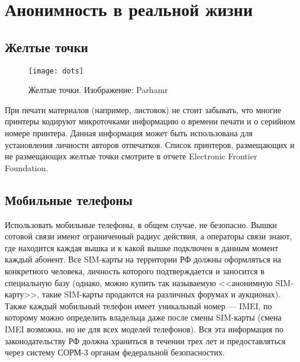 \chapter{Анонимность в реальной жизни}
\section{Желтые точки}
\begin{wrapfigure}[9]{r}{0.25\linewidth}
\texttt{[image: dots]}
\caption{Желтые точки. Изображение: Parhamr}
\end{wrapfigure}
При печати материалов (например, листовок) не стоит забывать, что многие принтеры  кодируют микроточками информацию о времени печати и о серийном номере принтера\cite{eff_dots}. Данная информация может быть использована для установления личности авторов отпечатков. Список принтеров, размещающих и не размещающих желтые точки смотрите в отчете Electronic Frontier Foundation\cite{eff_list}.
\section{Мобильные телефоны}
Использовать мобильные телефоны, в общем случае, не безопасно. Вышки сотовой связи имеют ограниченный радиус действия, а операторы связи знают, где находится каждая вышка и к какой вышке подключен в данным момент каждый абонент. Все SIM-карты на территории РФ должны оформляться на конкретного человека, личность которого подтверждается и заносится в специальную базу (однако, можно купить так называемую <<анонимную SIM-карту>>, такие SIM-карты продаются на различных форумах и аукционах). Также каждый мобильный телефон имеет уникальный номер --- IMEI, по которому можно определить владельца даже после смены SIM-карты (смена IMEI возможна, но не для всех моделей телефонов). Вся эта информация по законодательству РФ должна храниться в течении трех лет и предоставляться через систему СОРМ-3 органам федеральной безопасностих\cite{sorm_sorm3}.
